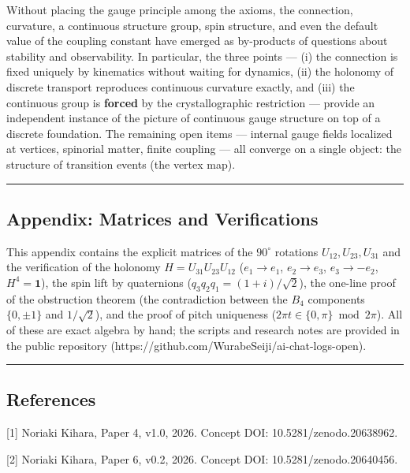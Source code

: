 \documentclass[
]{ltjsarticle}
\begin{document}
Without placing the gauge principle among the axioms, the connection,
curvature, a continuous structure group, spin structure, and even the
default value of the coupling constant have emerged as by-products of
questions about stability and observability. In particular, the three
points --- (i) the connection is fixed uniquely by kinematics without
waiting for dynamics, (ii) the holonomy of discrete transport reproduces
continuous curvature exactly, and (iii) the continuous group is
\textbf{forced} by the crystallographic restriction --- provide an
independent instance of the picture of continuous gauge structure on top
of a discrete foundation. The remaining open items --- internal gauge
fields localized at vertices, spinorial matter, finite coupling --- all
converge on a single object: the structure of transition events (the
vertex map).

\begin{center}\rule{0.5\linewidth}{0.5pt}\end{center}

\subsection{Appendix: Matrices and
Verifications}\label{appendix-matrices-and-verifications}

This appendix contains the explicit matrices of the \(90^\circ\)
rotations \(U_{12},U_{23},U_{31}\) and the verification of the holonomy
\(H=U_{31}U_{23}U_{12}\) (\(e_1\to e_1\), \(e_2\to e_3\),
\(e_3\to-e_2\), \(H^4=\mathbf{1}\)), the spin lift by quaternions
(\(q_3q_2q_1=(1+i)/\sqrt2\)), the one-line proof of the obstruction
theorem (the contradiction between the \(B_4\) components \(\{0,\pm1\}\)
and \(1/\sqrt2\)), and the proof of pitch uniqueness
(\(2\pi t\in\{0,\pi\}\bmod 2\pi\)). All of these are exact algebra by
hand; the scripts and research notes are provided in the public
repository (https://github.com/WurabeSeiji/ai-chat-logs-open).

\begin{center}\rule{0.5\linewidth}{0.5pt}\end{center}

\subsection{References}\label{references}

{[}1{]} Noriaki Kihara, Paper 4, v1.0, 2026. Concept DOI:
10.5281/zenodo.20638962.

{[}2{]} Noriaki Kihara, Paper 6, v0.2, 2026. Concept DOI:
10.5281/zenodo.20640456.
\end{document}
